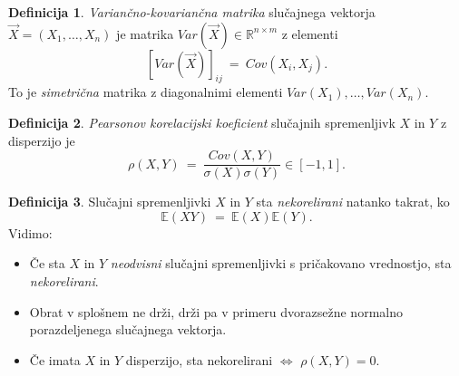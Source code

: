 \documentclass[11pt]{article}
\newcommand{\E}{\mathbb{E}}
\newcommand{\R}{\mathbb{R}}
\newcommand{\1}{\mathbbm{1}}
\theoremstyle{definition}
\newtheorem{definicija}{Definicija}[section]
\theoremstyle{definition}
\theoremstyle{definition}
\begin{document}
\begin{definicija}

\textit{Variančno-kovariančna matrika} slučajnega vektorja $\vec{X} = (X_1, \ldots, X_n)$ je matrika $Var(\vec{X}) \in \R^{n \times m}$ z elementi
$$[Var(\vec{X})]_{ij} ~=~ Cov(X_i, X_j).$$
To je \textit{simetrična} matrika z diagonalnimi elementi $Var(X_1), \ldots, Var(X_n)$.

\end{definicija}
\vspace{0.5cm}

\begin{definicija}

\textit{Pearsonov korelacijski koeficient} slučajnih spremenljivk $X$ in $Y$ z disperzijo je
$$\rho(X, Y) ~=~ \frac{Cov(X, Y)}{\sigma(X)\sigma(Y)} \in [-1, 1].$$

\end{definicija}
\vspace{0.5cm}

\begin{definicija}

Slučajni spremenljivki $X$ in $Y$ sta \textit{nekorelirani} natanko takrat, ko
$$\E(XY) ~=~ \E(X)\E(Y).$$
Vidimo:
\begin{itemize}
	\item Če sta $X$ in $Y$ \textit{neodvisni} slučajni spremenljivki s pričakovano vrednostjo, sta \textit{nekorelirani}.
	
	\item Obrat v splošnem ne drži, drži pa v primeru dvorazsežne normalno porazdeljenega slučajnega vektorja.
	
	\item Če imata $X$ in $Y$ disperzijo, sta nekorelirani $\iff$ $\rho(X, Y) = 0$.
\end{itemize}

\end{definicija}
\vspace{0.5cm}


\pagebreak

\end{document}
